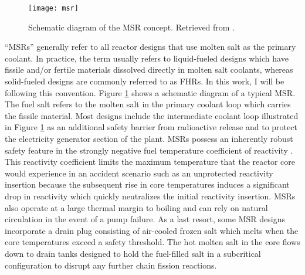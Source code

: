\begin{figure}[htb!]
	\centering
	\texttt{[image: msr]}
	\caption{Schematic diagram of the \gls{MSR} concept. Retrieved from
	\cite{doe_technology_2002}.}
	\label{fig:msr}
\end{figure}

``\glspl{MSR}'' generally refer to all reactor designs that use molten salt as
the primary coolant. In practice, the term usually refers to liquid-fueled
designs which have fissile and/or fertile materials dissolved directly in
molten salt coolants, whereas solid-fueled designs are commonly referred to as
\glspl{FHR}. In this work, I will be following this convention. Figure
\ref{fig:msr} shows a schematic diagram of a typical \gls{MSR}. The fuel salt
refers to the molten salt in the primary coolant loop which carries the fissile
material. Most designs include the intermediate coolant loop illustrated in
Figure \ref{fig:msr} as an additional safety barrier from radioactive release
and to protect the electricity generator section of the plant. \glspl{MSR}
possess an inherently robust
safety feature in the strongly negative fuel temperature coefficient of
reactivity \cite{elsheikh_safety_2013}. This reactivity coefficient limits the
maximum temperature that the reactor core would experience in an accident
scenario such as an unprotected reactivity insertion because the subsequent
rise in core temperatures induces a significant drop in reactivity which
quickly neutralizes the initial reactivity insertion. \glspl{MSR} also
operate at a large thermal margin to boiling and can rely on natural
circulation in the event of a pump failure. As a last resort, some \gls{MSR}
designs incorporate a drain plug consisting of air-cooled frozen salt which
melts when the core temperatures exceed a safety threshold. The hot molten salt
in the core flows down to drain tanks designed to hold the fuel-filled salt in
a subcritical configuration to disrupt any further chain fission reactions.

